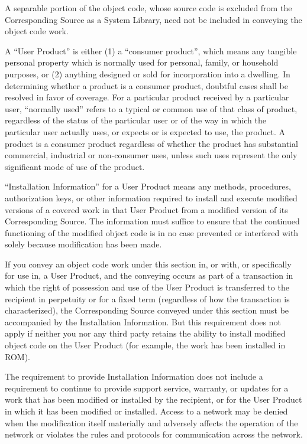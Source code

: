 {\begin{multicols}{4}
A separable portion of the object code, whose source code is excluded from the Corresponding Source as a System Library, need not be included in conveying the object code work.

A “User Product” is either (1) a “consumer product”, which means any tangible personal property which is normally used for personal, family, or household purposes, or (2) anything designed or sold for incorporation into a dwelling. In determining whether a product is a consumer product, doubtful cases shall be resolved in favor of coverage. For a particular product received by a particular user, “normally used” refers to a typical or common use of that class of product, regardless of the status of the particular user or of the way in which the particular user actually uses, or expects or is expected to use, the product. A product is a consumer product regardless of whether the product has substantial commercial, industrial or non-consumer uses, unless such uses represent the only significant mode of use of the product.

“Installation Information” for a User Product means any methods, procedures, authorization keys, or other information required to install and execute modified versions of a covered work in that User Product from a modified version of its Corresponding Source. The information must suffice to ensure that the continued functioning of the modified object code is in no case prevented or interfered with solely because modification has been made.

If you convey an object code work under this section in, or with, or specifically for use in, a User Product, and the conveying occurs as part of a transaction in which the right of possession and use of the User Product is transferred to the recipient in perpetuity or for a fixed term (regardless of how the transaction is characterized), the Corresponding Source conveyed under this section must be accompanied by the Installation Information. But this requirement does not apply if neither you nor any third party retains the ability to install modified object code on the User Product (for example, the work has been installed in ROM).

The requirement to provide Installation Information does not include a requirement to continue to provide support service, warranty, or updates for a work that has been modified or installed by the recipient, or for the User Product in which it has been modified or installed. Access to a network may be denied when the modification itself materially and adversely affects the operation of the network or violates the rules and protocols for communication across the network.


\end{multicols}}
